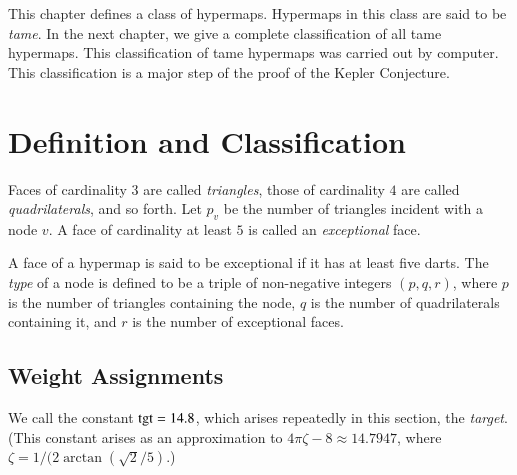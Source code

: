 





\label{sec:tame}


This chapter defines a class of hypermaps.  Hypermaps in this class
are said to be {\it tame}.  In the next chapter, we give a complete
classification of all tame hypermaps.  This classification of tame
hypermaps was carried out by computer.   This classification is a
major step of the proof of the Kepler Conjecture.

\section{Definition and Classification}


\begin{definition}
Faces of cardinality $3$ are called {\it triangles}, those of
cardinality $4$ are called {\it quadrilaterals}, and so forth. Let
$p_v$ be the number of triangles incident with a node $v$. A face of
cardinality at least $5$ is called an {\it exceptional\/} face.
\end{definition}

\begin{definition}\label{definition:type}
A face of a hypermap is said to be exceptional if it has at least
five darts.  The {\it type\/} of a node is defined to be a triple of
non-negative integers $(p,q,r)$, where $p$ is the number of
triangles containing the node, $q$ is the number of quadrilaterals
containing it, and $r$ is the number of exceptional faces.
%
\end{definition}


\subsection{Weight Assignments}\label{sec:wtassign}

We call the constant ${\operatorname{tgt}}=14.8$, which arises repeatedly in
this section, the {\it target}.  (This constant arises as an
approximation to $4\pi\zeta -8\approx 14.7947$, where $\zeta =
1/(2\arctan(\sqrt{2}/5)$.)
%

